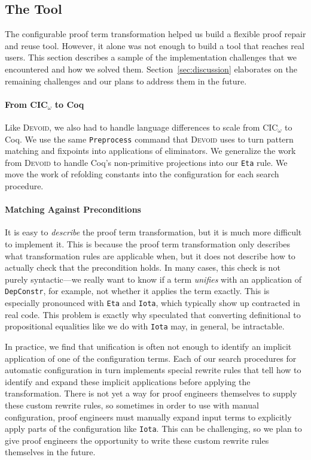 \subsection{The Tool}
\label{sec:implementation}

The configurable proof term transformation helped us build a flexible proof repair and reuse tool.
However, it alone was not enough to build a tool that reaches real users.
This section describes a sample of the implementation challenges that we encountered and how we solved them.
Section~\ref{sec:discussion} elaborates on the remaining challenges and our plans to address them in the future.

\paragraph{From CIC$_{\omega}$ to Coq}

Like \textsc{Devoid}, we also had to handle language differences to scale from CIC$_{\omega}$ to Coq.
We use the same \lstinline{Preprocess} command that \textsc{Devoid} uses to turn pattern matching and fixpoints into applications of eliminators.
We generalize the work from \textsc{Devoid} to handle Coq's non-primitive projections into our \lstinline{Eta} rule.
We move the work of refolding constants into the configuration for each search procedure.

\paragraph{Matching Against Preconditions}

It is easy to \textit{describe} the proof term transformation, but it is much more difficult to implement it.
This is because the proof term transformation only describes what transformation rules are applicable when,
but it does not describe how to actually check that the precondition holds.
In many cases, this check is not purely syntactic---we really want to know if a term \textit{unifies}
with an application of \lstinline{DepConstr}, for example, not whether it applies the term exactly.
This is especially pronounced with \lstinline{Eta} and \lstinline{Iota},
which typically show up contracted in real code.
This problem is exactly why \citet{tabareau2019marriage} speculated that converting definitional to propositional equalities
like we do with \lstinline{Iota} may, in general, be intractable.

In practice, we find that unification is often not enough to identify an implicit application of one of the configuration terms.
Each of our search procedures for automatic configuration in turn implements special rewrite rules that tell \toolname
how to identify and expand these implicit applications before applying the transformation.
There is not yet a way for proof engineers themselves to supply these custom rewrite rules,
so sometimes in order to use \toolname with manual configuration, proof engineers must manually expand
input terms to explicitly apply parts of the configuration like \lstinline{Iota}.
This can be challenging, so we plan to give proof engineers the opportunity to write
these custom rewrite rules themselves in the future.

